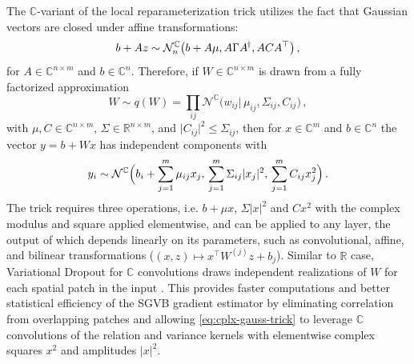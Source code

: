 \documentclass[a4paper,10pt,onecolumn]{article}
\newcommand{\real}{\mathbb{R}}
\newcommand{\cplx}{\mathbb{C}}
\newcommand{\hop}{{\mkern-1.5mu\dagger}}
\begin{document}
The $\cplx$-variant of the local reparameterization trick utilizes the fact that Gaussian
vectors are closed under affine transformations:
\begin{equation}  \label{eq:cn-affine}
  b + A z \sim \mathcal{N}_n^{\cplx}\bigl(
      b + A\mu, A \Gamma A^{\hop}, A C A^\top
    \bigr)
  \,,
\end{equation}
for $A \in \cplx^{n \times m}$ and $b \in \cplx^{n}$. Therefore, if $W \in \cplx^{n\times m}$
is drawn from a fully factorized approximation
\begin{equation}  \label{eq:c-gauss-vi-general}
  W \sim q(W)
    = \prod_{ij} \mathcal{N}^{\cplx} \bigl(
      w_{ij} \vert\, \mu_{ij}, \Sigma_{ij}, C_{ij}
    \bigr)
  \,,
\end{equation}
with $
  \mu, C \in \cplx^{n\times m}
$, $\Sigma \in \real^{n\times m}$, and $
  \lvert C_{ij} \rvert^2 \leq \Sigma_{ij}
$, then for $x \in \cplx^m$ and $b \in \cplx^n$ the vector $y = b + W x$ has independent
components with
\begin{equation}  \label{eq:cplx-gauss-trick}
  y_i
    \sim \mathcal{N}^{\cplx}
      \Bigl(
        b_i + \sum_{j=1}^m \mu_{ij} x_j,
        \, \sum_{j=1}^m \Sigma_{ij} \lvert x_j \rvert^2,
        \, \sum_{j=1}^m C_{ij} x_j^2
      \Bigr)
    \,.
\end{equation}
The trick requires three operations, i.e. $b + \mu x$, $\Sigma \lvert x \rvert^2$ and
$C x^2$ with the complex modulus and square applied elementwise, and can be applied to
any layer, the output of which depends linearly on its parameters, such as convolutional,
affine, and bilinear transformations ($
  (x, z) \mapsto x^\top W^{(j)} z + b_j
$). Similar to $\real$ case, Variational Dropout for $\cplx$ convolutions draws independent
realizations of $W$ for each spatial patch in the input \citep{molchanov_variational_2017}.
This provides faster computations and better statistical efficiency of the SGVB gradient
estimator by eliminating correlation from overlapping patches \citep{kingma_variational_2015}
and allowing \eqref{eq:cplx-gauss-trick} to leverage $\cplx$ convolutions of the relation
and variance kernels with elementwise complex squares $x^2$ and amplitudes $\lvert x \rvert^2$.
\end{document}
